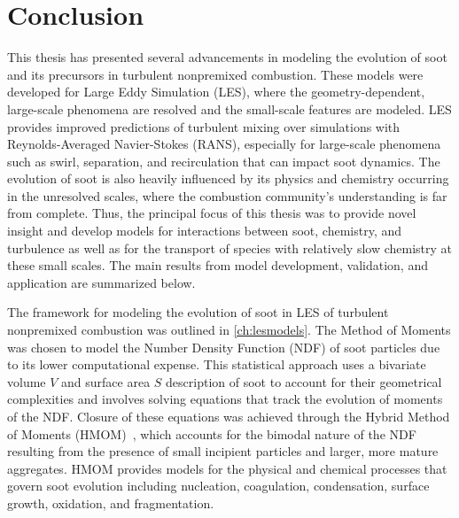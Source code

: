 \chapter{Conclusion\label{ch:conclusion}}

This thesis has presented several advancements in modeling the evolution of soot and its precursors in turbulent nonpremixed combustion. These models were developed for Large Eddy Simulation (LES), where the geometry-dependent, large-scale phenomena are resolved and the small-scale features are modeled. LES provides improved predictions of turbulent mixing over simulations with Reynolds-Averaged Navier-Stokes (RANS), especially for large-scale phenomena such as swirl, separation, and recirculation that can impact soot dynamics. The evolution of soot is also heavily influenced by its physics and chemistry occurring in the unresolved scales, where the combustion community's understanding is far from complete. Thus, the principal focus of this thesis was to provide novel insight and develop models for interactions between soot, chemistry, and turbulence as well as for the transport of species with relatively slow chemistry at these small scales. The main results from model development, validation, and application are summarized below.

The framework for modeling the evolution of soot in LES of turbulent nonpremixed combustion was outlined in \cref{ch:lesmodels}. The Method of Moments was chosen to model the Number Density Function (NDF) of soot particles due to its lower computational expense. This statistical approach uses a bivariate volume $V$ and surface area $S$ description of soot to account for their geometrical complexities and involves solving equations that track the evolution of moments of the NDF. Closure of these equations was achieved through the Hybrid Method of Moments (HMOM)~\cite{hmom2009}, which accounts for the bimodal nature of the NDF resulting from the presence of small incipient particles and larger, more mature aggregates. HMOM provides models for the physical and chemical processes that govern soot evolution including nucleation, coagulation, condensation, surface growth, oxidation, and fragmentation.

